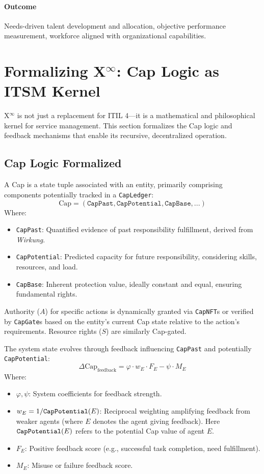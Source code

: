 \documentclass[12pt, a4paper]{scrartcl}
\newcommand{\Xinf}{X$^\infty$}                        %
\newcommand{\CapPotential}{\texttt{CapPotential}}    %
\newcommand{\CapPast}{\texttt{CapPast}}              %
\newcommand{\CapBase}{\texttt{CapBase}}              %
\newcommand{\CapLedger}{\texttt{CapLedger}}          %
\newcommand{\Wirkung}{\textit{Wirkung}}                 %
\newcommand{\CapNFT}{\texttt{CapNFT}}
\newcommand{\CapGate}{\texttt{CapGate}}
\begin{document}
\paragraph{Outcome} Needs-driven talent development and allocation, objective performance measurement, workforce aligned with organizational capabilities.

\section{Formalizing \Xinf{}: Cap Logic as ITSM Kernel}
\Xinf{} is not just a replacement for ITIL 4—it is a mathematical and philosophical kernel for service management. This section formalizes the Cap logic and feedback mechanisms that enable its recursive, decentralized operation.

\subsection{Cap Logic Formalized}


A Cap is a state tuple associated with an entity, primarily comprising components potentially tracked in a \CapLedger{}: %
\[ \text{Cap} = (\CapPast{}, \CapPotential{}, \CapBase{}, ...) \]
Where:
\begin{itemize}
    \item \CapPast{}: Quantified evidence of past responsibility fulfillment, derived from \Wirkung{}.
    \item \CapPotential{}: Predicted capacity for future responsibility, considering skills, resources, and load.
    \item \CapBase{}: Inherent protection value, ideally constant and equal, ensuring fundamental rights.
\end{itemize}
Authority ($A$) for specific actions is dynamically granted via \CapNFT{}s or verified by \CapGate{}s based on the entity's current Cap state relative to the action's requirements. Resource rights ($S$) are similarly Cap-gated.

The system state evolves through feedback influencing \CapPast{} and potentially \CapPotential{}: %
\[ \Delta \text{Cap}_{\text{feedback}} = \varphi \cdot w_E \cdot F_E - \psi \cdot M_E \]
Where:
\begin{itemize}
    \item $\varphi, \psi$: System coefficients for feedback strength.
    \item $w_E = 1/\text{\CapPotential{}}(E)$: Reciprocal weighting amplifying feedback from weaker agents (where $E$ denotes the agent giving feedback). Here $\text{\CapPotential{}}(E)$ refers to the potential Cap value of agent $E$.
    \item $F_E$: Positive feedback score (e.g., successful task completion, need fulfillment).
    \item $M_E$: Misuse or failure feedback score.
\end{itemize}
\end{document}

